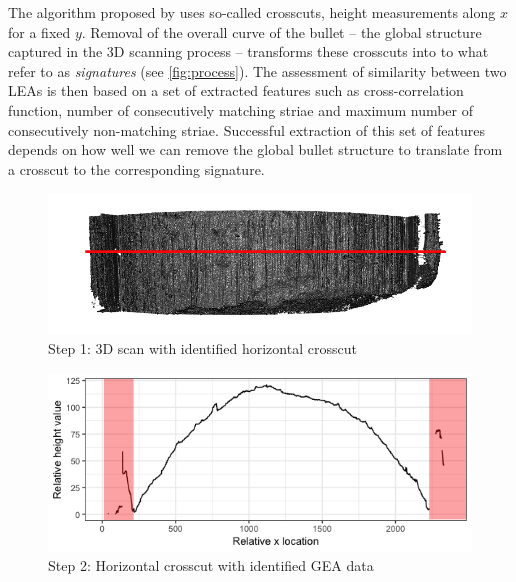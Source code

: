 \documentclass[12pt]{article}
\begin{document}
The algorithm proposed by \citet{Hare1} uses so-called crosscuts, height
measurements along \(x\) for a fixed \(y\). Removal of the overall curve
of the bullet -- the global structure captured in the 3D scanning
process -- transforms these crosscuts into to what \citet{Hare1} refer
to as \emph{signatures} (see \autoref{fig:process}). The assessment of
similarity between two LEAs is then based on a set of extracted features
such as cross-correlation function, number of consecutively matching
striae \citep[see][]{Biasotti} and maximum number of consecutively
non-matching striae. Successful extraction of this set of features
depends on how well we can remove the global bullet structure to
translate from a crosscut to the corresponding signature.

\begin{figure}
\begin{minipage}[b]{0.45\linewidth}
    \raggedleft
    \includegraphics[width=\textwidth]{images/3d_plot_top_crosscut}
    \centering
    Step 1: 3D scan with identified horizontal crosscut
\end{minipage}
\hspace{.5cm}
\begin{minipage}[b]{0.45\linewidth}
    \raggedright
    \includegraphics[width=\textwidth]{images/profile_paper}
    \centering
    Step 2: Horizontal crosscut with identified GEA data
\end{minipage}\\


\end{figure}
\end{document}
